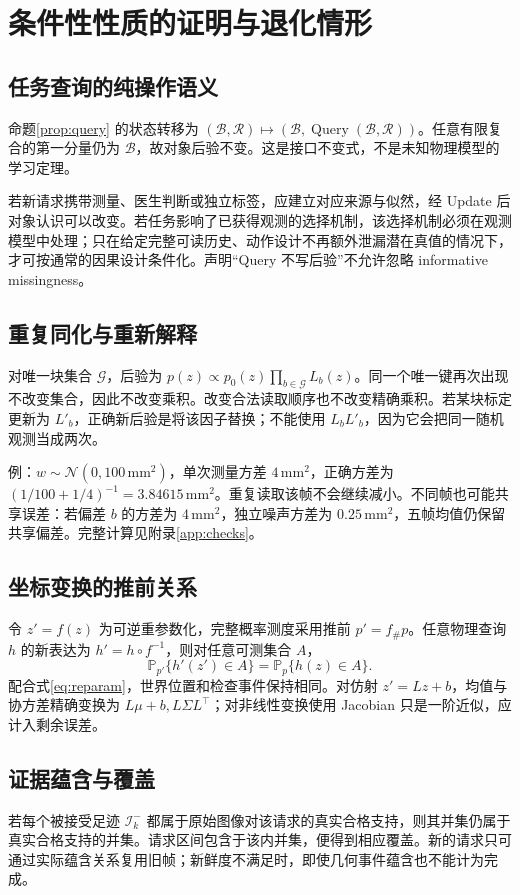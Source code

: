 \documentclass[UTF8,11pt,a4paper,fontset=fandol]{ctexart}
\numberwithin{equation}{section}
\theoremstyle{definition}
\newcommand{\Prob}{\mathbb P}
\newcommand{\N}{\mathcal N}
\begin{document}
\section{条件性性质的证明与退化情形}
\label{app:proofs}
\subsection{任务查询的纯操作语义}
命题\ref{prop:query} 的状态转移为 $(\mathcal B,\mathcal R)\mapsto(\mathcal B,\operatorname{Query}(\mathcal B,\mathcal R))$。任意有限复合的第一分量仍为 $\mathcal B$，故对象后验不变。这是接口不变式，不是未知物理模型的学习定理。

若新请求携带测量、医生判断或独立标签，应建立对应来源与似然，经 Update 后对象认识可以改变。若任务影响了已获得观测的选择机制，该选择机制必须在观测模型中处理；只在给定完整可读历史、动作设计不再额外泄漏潜在真值的情况下，才可按通常的因果设计条件化。声明“Query 不写后验”不允许忽略 informative missingness。

\subsection{重复同化与重新解释}
对唯一块集合 $\mathcal G$，后验为 $p(z)\propto p_0(z)\prod_{b\in\mathcal G}L_b(z)$。同一个唯一键再次出现不改变集合，因此不改变乘积。改变合法读取顺序也不改变精确乘积。若某块标定更新为 $L'_b$，正确新后验是将该因子替换；不能使用 $L_bL'_b$，因为它会把同一随机观测当成两次。

例：$w\sim\N(0,100\,\mathrm{mm}^2)$，单次测量方差 $4\,\mathrm{mm}^2$，正确方差为 $(1/100+1/4)^{-1}=3.84615\,\mathrm{mm}^2$。重复读取该帧不会继续减小。不同帧也可能共享误差：若偏差 $b$ 的方差为 $4\,\mathrm{mm}^2$，独立噪声方差为 $0.25\,\mathrm{mm}^2$，五帧均值仍保留共享偏差。完整计算见附录\ref{app:checks}。

\subsection{坐标变换的推前关系}
令 $z'=f(z)$ 为可逆重参数化，完整概率测度采用推前 $p'=f_\#p$。任意物理查询 $h$ 的新表达为 $h'=h\circ f^{-1}$，则对任意可测集合 $A$，
\begin{equation}
\Prob_{p'}\{h'(z')\in A\}=\Prob_p\{h(z)\in A\}.
\end{equation}
配合式\eqref{eq:reparam}，世界位置和检查事件保持相同。对仿射 $z'=Lz+b$，均值与协方差精确变换为 $L\mu+b,L\Sigma L^\top$；对非线性变换使用 Jacobian 只是一阶近似，应计入剩余误差。

\subsection{证据蕴含与覆盖}
若每个被接受足迹 $\mathcal I^-_k$ 都属于原始图像对该请求的真实合格支持，则其并集仍属于真实合格支持的并集。请求区间包含于该内并集，便得到相应覆盖。新的请求只可通过实际蕴含关系复用旧帧；新鲜度不满足时，即使几何事件蕴含也不能计为完成。
\end{document}
